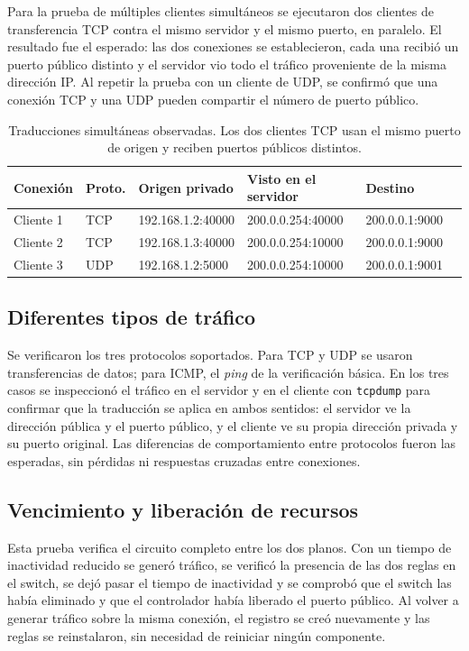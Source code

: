 ﻿\documentclass[10pt,a4paper]{article}
\begin{document}
Para la prueba de múltiples clientes simultáneos se ejecutaron dos clientes de
transferencia TCP contra el mismo servidor y el mismo puerto, en paralelo. El
resultado fue el esperado: las dos conexiones se establecieron, cada una recibió un
puerto público distinto y el servidor vio todo el tráfico proveniente de la misma
dirección IP. Al repetir la prueba con un cliente de UDP, se confirmó que una
conexión TCP y una UDP pueden compartir el número de puerto público.

\begin{table}[H]
\centering
\small
\begin{tabular}{llllll}
\toprule
\textbf{Conexión} & \textbf{Proto.} & \textbf{Origen privado} & \textbf{Visto en el servidor} & \textbf{Destino} \\
\midrule
Cliente 1 & TCP & 192.168.1.2:40000 & 200.0.0.254:40000 & 200.0.0.1:9000 \\
Cliente 2 & TCP & 192.168.1.3:40000 & 200.0.0.254:10000 & 200.0.0.1:9000 \\
Cliente 3 & UDP & 192.168.1.2:5000  & 200.0.0.254:10000 & 200.0.0.1:9001 \\
\bottomrule
\end{tabular}
\caption{Traducciones simultáneas observadas. Los dos clientes TCP usan el mismo
puerto de origen y reciben puertos públicos distintos.}
\label{tab:simultaneas}
\end{table}

\subsection{Diferentes tipos de tráfico}

Se verificaron los tres protocolos soportados. Para TCP y UDP se usaron
transferencias de datos; para ICMP, el \emph{ping} de la verificación básica. En los
tres casos se inspeccionó el tráfico en el servidor y en el cliente con
\texttt{tcpdump} para confirmar que la traducción se aplica en ambos sentidos: el
servidor ve la dirección pública y el puerto público, y el cliente ve su propia
dirección privada y su puerto original. Las diferencias de comportamiento entre
protocolos fueron las esperadas, sin pérdidas ni respuestas cruzadas entre
conexiones.

\subsection{Vencimiento y liberación de recursos}

Esta prueba verifica el circuito completo entre los dos planos. Con un tiempo de
inactividad reducido se generó tráfico, se verificó la presencia de las dos reglas en
el switch, se dejó pasar el tiempo de inactividad y se comprobó que el switch las
había eliminado y que el controlador había liberado el puerto público. Al volver a
generar tráfico sobre la misma conexión, el registro se creó nuevamente y las reglas
se reinstalaron, sin necesidad de reiniciar ningún componente.
\end{document}
